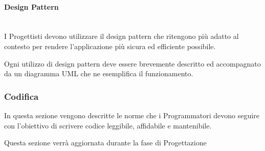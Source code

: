 \paragraph{Design Pattern}\mbox{}\\
I Progettisti devono utilizzare il design pattern che ritengono più adatto al contesto per rendere l'applicazione più sicura ed efficiente possibile.

Ogni utilizzo di design pattern deve essere brevemente descritto ed accompagnato da un diagramma UML che ne esemplifica il funzionamento.

\subsubsection{Codifica}
In questa sezione vengono descritte le norme che i Programmatori devono seguire con l'obiettivo di scrivere codice leggibile, affidabile e mantenibile.

Questa sezione verrà aggiornata durante la fase di Progettazione

